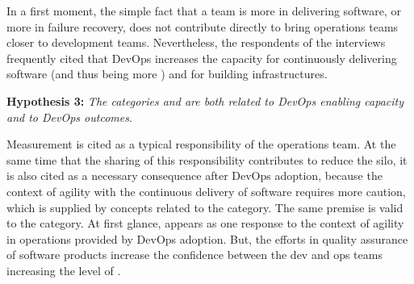 In a first moment, the simple fact that a team is more
 in delivering software, or more  in failure recovery, does not
contribute directly to bring operations teams closer to development teams.
Nevertheless, the respondents of the interviews frequently cited that DevOps
increases the capacity for continuously delivering software (and thus being more )
and for building  infrastructures.

\begin{mh}
\textbf{Hypothesis 3:} \textit{The categories  and 
are both related to DevOps enabling capacity and to DevOps outcomes}.
\end{mh}

Measurement is cited as a typical responsibility of the operations team.
At the same time that the sharing of this responsibility contributes to reduce the silo,
it is also cited as a necessary consequence after DevOps adoption, because
the context of agility with the continuous delivery of software requires more caution,
which is supplied by concepts related to the  category.
The same premise is valid to the  category. At first glance,
 appears as one response to the context of agility in operations
provided by DevOps adoption. But, the efforts in quality assurance of software products
increase the confidence between the dev and ops teams increasing the level
of \cc.



